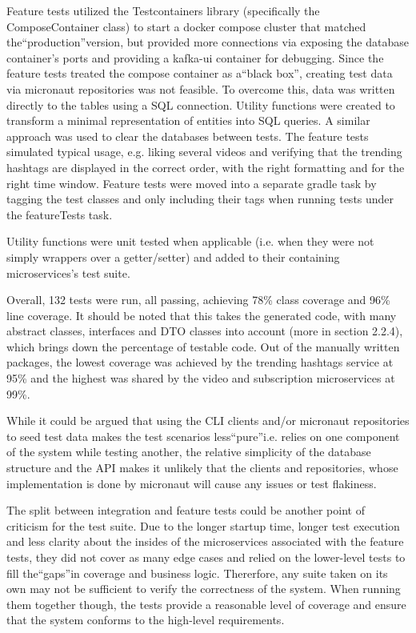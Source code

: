 \documentclass[parskip=full]{article}
\begin{document}
Feature tests utilized the Testcontainers library (specifically the ComposeContainer class) to start a docker compose cluster that matched the``production''version, but provided more connections via exposing the database container's ports and providing a kafka-ui container for debugging.
Since the feature tests treated the compose container as a``black box'', creating test data via micronaut repositories was not feasible.
To overcome this, data was written directly to the tables using a SQL connection.
Utility functions were created to transform a minimal representation of entities into SQL queries.
A similar approach was used to clear the databases between tests.
The feature tests simulated typical usage, e.g. liking several videos and verifying that the trending hashtags are displayed in the correct order, with the right formatting and for the right time window.
Feature tests were moved into a separate gradle task by tagging the test classes and only including their tags when running tests under the featureTests task.

Utility functions were unit tested when applicable (i.e. when they were not simply wrappers over a getter/setter) and added to their containing microservices's test suite.

Overall, 132 tests were run, all passing, achieving 78\% class coverage and 96\% line coverage.
It should be noted that this takes the generated code, with many abstract classes, interfaces and DTO classes into account (more in section 2.2.4), which brings down the percentage of testable code.
Out of the manually written packages, the lowest coverage was achieved by the trending hashtags service at 95\% and the highest was shared by the video and subscription microservices at 99\%.

While it could be argued that using the CLI clients and/or micronaut repositories to seed test data makes the test scenarios less``pure''i.e. relies on one component of the system while testing another, the relative simplicity of the database structure and the API makes it unlikely that the clients and repositories, whose implementation is done by micronaut will cause any issues or test flakiness.

The split between integration and feature tests could be another point of criticism for the test suite.
Due to the longer startup time, longer test execution and less clarity about the insides of the microservices associated with the feature tests, they did not cover as many edge cases and relied on the lower-level tests to fill the``gaps''in coverage and business logic.
Thererfore, any suite taken on its own may not be sufficient to verify the correctness of the system.
When running them together though, the tests provide a reasonable level of coverage and ensure that the system conforms to the high-level requirements.
\end{document}

